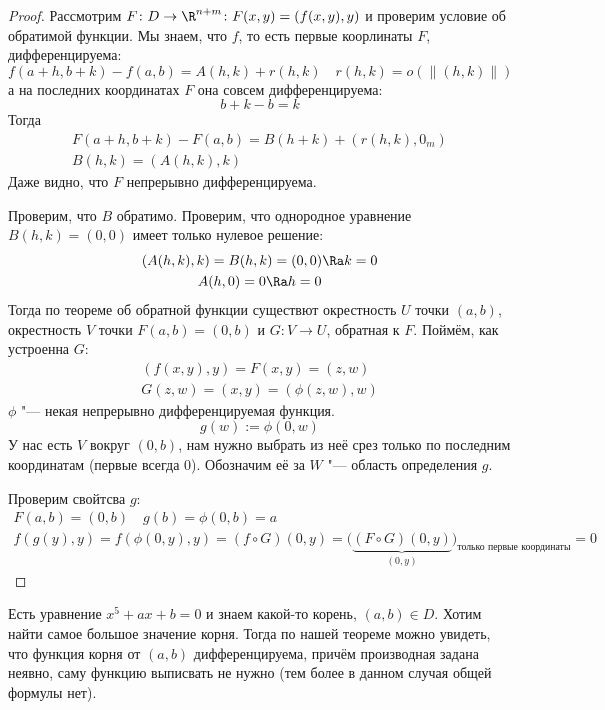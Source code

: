 \begin{proof}
	Рассмотрим $F\colon D \to \R^{n+m}\colon F(x, y) = (f(x, y), y)$ и проверим условие об обратимой функции.
	Мы знаем, что $f$, то есть первые коорлинаты $F$, дифференцируема:
	\[ f(a+h, b+k) - f(a, b) = A(h, k) + r(h, k) \quad r(h, k) = o(\|(h, k)\|) \]
	а на последних координатах $F$ она совсем дифференцируема:
	\[ b + k - b = k \]
	Тогда
	\begin{gather*}
		F(a+h, b+k) - F(a, b) = B(h+k) + (r(h, k), 0_m) \\
		B(h, k) = (A(h, k), k)
	\end{gather*}
	Даже видно, что $F$ непрерывно дифференцируема.

	Проверим, что $B$ обратимо. Проверим, что однородное уравнение $B(h, k) = (0, 0)$ имеет только нулевое решение:
	\begin{gather*}
		(A(h, k), k) = B(h, k) = (0, 0) \Ra k = 0 \\
		A(h, 0) = 0 \Ra h = 0
	\end{gather*}
	Тогда по теореме об обратной функции существют окрестность $U$ точки $(a, b)$,
	окрестность $V$ точки $F(a, b) = (0, b)$ и $G\colon V \to U$, обратная к $F$.
	Поймём, как устроенна $G$:
	\begin{gather*}
		(f(x, y), y) = F(x, y) = (z, w) \\
		G(z, w) = (x, y) = (\phi(z, w), w)
	\end{gather*}
	$\phi$ "--- некая непрерывно дифференцируемая функция.
	\[ g(w) := \phi(0, w) \]
	У нас есть $V$ вокруг $(0, b)$, нам нужно выбрать из неё срез только по последним координатам (первые всегда 0).
	Обозначим её за $W$ "--- область определения $g$.

	Проверим свойтсва $g$:
	\begin{gather*}
		F(a, b) = (0, b) \quad g(b) = \phi(0, b) = a \\
		f(g(y), y) = f(\phi(0, y), y) = (f \circ G)(0, y)
			= \biggl(\underbrace{(F \circ G)(0, y)}_{(0, y)}\biggr)_{\text{только первые координаты}} = 0
	\end{gather*}
\end{proof}

\begin{exmp}
	Есть уравнение $x^5 + ax + b = 0$ и знаем какой-то корень, $(a, b) \in D$.
	Хотим найти самое большое значение корня.
	Тогда по нашей теореме можно увидеть, что функция корня от $(a, b)$ дифференцируема,
	причём производная задана неявно, саму функцию выписвать не нужно (тем более в данном случая общей формулы нет).
\end{exmp}

